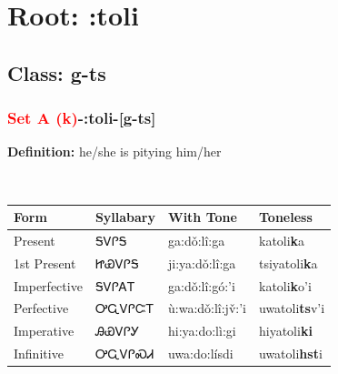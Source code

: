 \needspace{4in}
\section*{Root: :toli}
\nopagebreak
{}
\needspace{3in}
\subsection*{Class: g-ts}
\nopagebreak
\needspace{2in}
\subsubsection*{\textcolor{Red}{Set A (k)}{-}\textbf{:toli}{-}[g-ts]}
\nopagebreak
\textbf{Definition: } he/she is pitying him/her
\\[0.5em]
\begin{tabularx}{\textwidth}{l X X X}%
\toprule%
\textbf{Form}&\textbf{Syllabary}&\textbf{With Tone}&\textbf{Toneless}\\%
\midrule%
Present&ᎦᏙᎵᎦ&ga:dǒ:lî:ga&katoli\textbf{k}a\\%
1st Present&ᏥᏯᏙᎵᎦ&ji:ya:dǒ:lî:ga&tsiyatoli\textbf{k}a\\%
Imperfective&ᎦᏙᎵᎪᎢ&ga:dǒ:lî:gó:’i&katoli\textbf{k}o'i\\%
Perfective&ᎤᏩᏙᎵᏨᎢ&ù:wa:dǒ:lî:jv̌:’i&uwatoli\textbf{ts}v'i\\%
Imperative&ᎯᏯᏙᎵᎩ&hi:ya:do:lì:gi&hiyatoli\textbf{ki}\\%
Infinitive&ᎤᏩᏙᎵᏍᏗ&uwa:do:lísdi&uwatoli\textbf{hst}i\\%
\bottomrule%
\end{tabularx}
\\[1em]